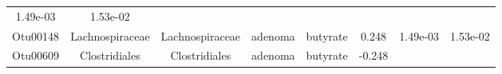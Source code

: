 \documentclass[11pt,]{article}
\begin{document}
\begin{longtable}[]{@{}cccccccc@{}}
\begin{minipage}[t]{0.08\columnwidth}
1.49e-03\strut
\end{minipage} & \begin{minipage}[t]{0.08\columnwidth}\centering\strut
1.53e-02\strut
\end{minipage}\tabularnewline
\begin{minipage}[t]{0.08\columnwidth}\centering\strut
Otu00148\strut
\end{minipage} & \begin{minipage}[t]{0.15\columnwidth}\centering\strut
Lachnospiraceae\strut
\end{minipage} & \begin{minipage}[t]{0.15\columnwidth}\centering\strut
Lachnospiraceae\strut
\end{minipage} & \begin{minipage}[t]{0.08\columnwidth}\centering\strut
adenoma\strut
\end{minipage} & \begin{minipage}[t]{0.09\columnwidth}\centering\strut
butyrate\strut
\end{minipage} & \begin{minipage}[t]{0.07\columnwidth}\centering\strut
0.248\strut
\end{minipage} & \begin{minipage}[t]{0.08\columnwidth}\centering\strut
1.49e-03\strut
\end{minipage} & \begin{minipage}[t]{0.08\columnwidth}\centering\strut
1.53e-02\strut
\end{minipage}\tabularnewline
\begin{minipage}[t]{0.08\columnwidth}\centering\strut
Otu00609\strut
\end{minipage} & \begin{minipage}[t]{0.15\columnwidth}\centering\strut
Clostridiales\strut
\end{minipage} & \begin{minipage}[t]{0.15\columnwidth}\centering\strut
Clostridiales\strut
\end{minipage} & \begin{minipage}[t]{0.08\columnwidth}\centering\strut
adenoma\strut
\end{minipage} & \begin{minipage}[t]{0.09\columnwidth}\centering\strut
butyrate\strut
\end{minipage} & \begin{minipage}[t]{0.07\columnwidth}\centering\strut
-0.248\strut
\end{minipage} & \begin{minipage}[t]{0.08\columnwidth}\centering\strut

\end{minipage}
\end{longtable}
\end{document}
